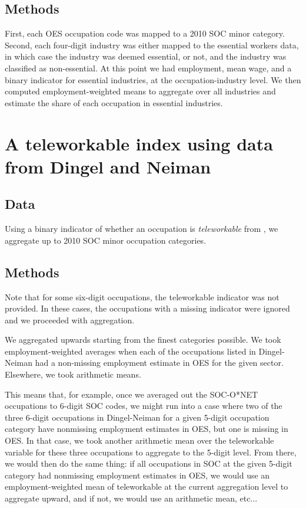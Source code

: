 \documentclass{article}
\begin{document}
\subsection{Methods}
First, each OES occupation code was mapped to a 2010 SOC minor category. Second, each four-digit industry was either mapped to the essential workers data, in which case the industry was deemed essential, or not, and the industry was classified as non-essential.
At this point we had employment, mean wage, and a binary indicator for essential industries, at the occupation-industry level. We then computed employment-weighted means to aggregate over all industries and estimate the share of each occupation in essential industries.

\section{A teleworkable index using data from Dingel and Neiman}

\subsection{Data}
Using a binary indicator of whether an occupation is \emph{teleworkable} from \cite{DN}, we aggregate up to 2010 SOC minor occupation categories.

\subsection{Methods}
Note that for some six-digit occupations, the teleworkable indicator was not provided. In these cases, the occupations with a missing indicator were ignored and we proceeded with aggregation.

We aggregated upwards starting from the finest categories possible. We took employment-weighted averages when each of the occupations listed in Dingel-Neiman had a non-missing employment estimate in OES for the given sector. Elsewhere, we took arithmetic means. 

This means that, for example, once we averaged out the SOC-O*NET occupations to 6-digit SOC codes, we might run into a case where two of the three 6-digit occupations in Dingel-Neiman for a given 5-digit occupation category have nonmissing employment estimates in OES, but one is missing in OES. In that case, we took another arithmetic mean over the teleworkable variable for these three occupations to aggregate to the 5-digit level. From there, we would then do the same thing: if all occupations in SOC at the given 5-digit category had nonmissing employment estimates in OES, we would use an employment-weighted mean of teleworkable at the current aggregation level to aggregate upward, and if not, we would use an arithmetic mean, etc...




\end{document}
